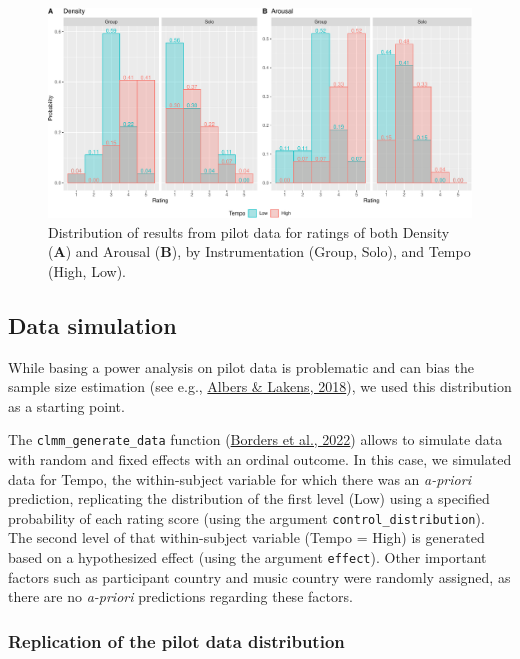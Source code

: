 \documentclass[
  bookmarksnumbered]{article}
\begin{document}
\begin{figure}
\centering
\includegraphics{Power_analysis_files/figure-latex/unnamed-chunk-3-1.pdf}
\caption{\label{fig:unnamed-chunk-3}Distribution of results from pilot data for ratings of both Density (\textbf{A}) and Arousal (\textbf{B}), by Instrumentation (Group, Solo), and Tempo (High, Low).}
\end{figure}

\hypertarget{data-simulation}{%
\subsection{Data simulation}\label{data-simulation}}

While basing a power analysis on pilot data is problematic and can bias the sample size estimation (see e.g., \protect\hyperlink{ref-albersWhenPowerAnalyses2018}{Albers \& Lakens, 2018}), we used this distribution as a starting point.

The \texttt{clmm\_generate\_data} function (\protect\hyperlink{ref-bordersPowerAnalysisOrdinal2022}{Borders et al., 2022}) allows to simulate data with random and fixed effects with an ordinal outcome. In this case, we simulated data for Tempo, the within-subject variable for which there was an \emph{a-priori} prediction, replicating the distribution of the first level (Low) using a specified probability of each rating score (using the argument \texttt{control\_distribution}). The second level of that within-subject variable (Tempo = High) is generated based on a hypothesized effect (using the argument \texttt{effect}). Other important factors such as participant country and music country were randomly assigned, as there are no \emph{a-priori} predictions regarding these factors.

\hypertarget{replication-of-the-pilot-data-distribution}{%
\subsubsection{Replication of the pilot data distribution}\label{replication-of-the-pilot-data-distribution}}
\end{document}
